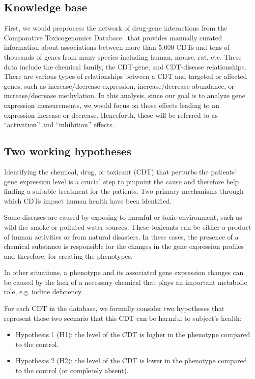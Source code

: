 \subsection{Knowledge base}
First, we would preprocess the network of drug-gene interactions from the Comparative Toxicogenomics Database~\cite{mattingly2006comparative} that provides manually curated information about associations between more than 5,000 CDTs and tens of thousands of genes from many species including human, mouse, rat, etc. These data include the chemical family, the CDT-gene, and CDT-disease relationships.
There are various types of relationships between a CDT and targeted or affected genes, such as increase/decrease expression, increase/decrease abundance, or increase/decrease methylation.
In this analysis, since our goal is to analyze gene expression measurements, we would focus on  those effects leading to an expression increase or decrease. Henceforth, these will be referred to as ``activation'' and ``inhibition'' effects.



\subsection{Two working hypotheses}

Identifying the chemical, drug, or toxicant (CDT) that perturbs the patients' gene expression level is a crucial step to pinpoint the cause and therefore help finding a suitable treatment for the patients. Two primary mechanisms through which CDTs impact human health have been identified.

Some diseases are caused by exposing to harmful or toxic environment, such as wild fire smoke or polluted water sources. These toxicants can be either a product of human activities or from natural disasters. In these cases, the presence of a chemical substance  is responsible for the changes in  the gene expression profiles and  therefore, for creating the phenotypes. 

In other situations,  a phenotype and its associated  gene expression changes  can be caused by the lack of a necessary chemical  that plays an important metabolic role, e.g. iodine deficiency. 

For each CDT in the database, we formally consider two hypotheses that represent these two scenario that this CDT can be harmful to subject's health:

\begin{itemize}
\item Hypothesis 1 (H1): the level of the CDT is higher in the phenotype compared to the control.%
\item Hypothesis 2 (H2): the level of the CDT  is lower  in the phenotype compared to the control (or completely absent).%
\end{itemize}

